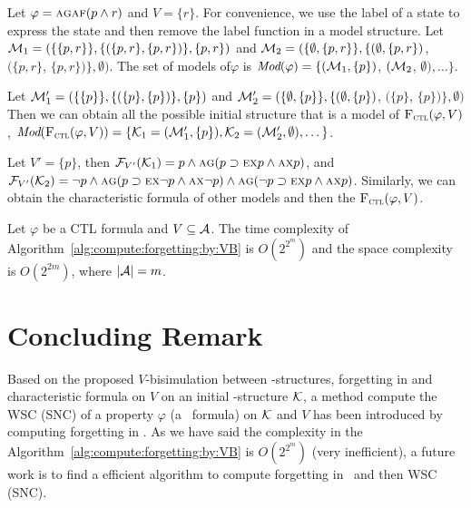 \documentclass{article}
\begin{document}
\begin{example}
Let $\varphi=\textsc{a}\textsc{g} \textsc{a}\textsc{f} (p \wedge r)$ and $V=\{r\}$. For convenience, we use the label of a state to express the state and then remove the label function in a model structure.
Let ${\cal M}_1=(\{\{p,r\}\}, \{(\{p,r\}, \{p,r\})\}, \{p,r\})$ and ${\cal M}_2=(\{\emptyset,\{p,r\}\}, \{(\emptyset, \{p,r\})$, $(\{p,r\}$, $\{p,r\})\}, \emptyset)$.
The set of models of$\varphi$ is $\textit{Mod}(\varphi)=\{({\cal M}_1, \{p\})$, $({\cal M}_2$, $\emptyset), \dots\}$.

Let ${\cal M}_1'=(\{\{p\}\}, \{(\{p\}, \{p\})\}, \{p\})$ and ${\cal M}_2'=(\{\emptyset,\{p\}\}, \{(\emptyset, \{p\})$, $(\{p\}$, $\{p\})\}, \emptyset)$
  Then we can obtain all the possible initial structure that is a model of ${\textsc{F}_{\textsc{ctl}}}(\varphi, V)$, \ie $\textit{Mod}({\textsc{F}_{\textsc{ctl}}}(\varphi, V)) =\{{\cal K}_1=({\cal M}_1', \{p\}), {\cal K}_2=({\cal M}_2', \emptyset), \dots\}$.

Let $V'=\{p\}$, then 
 ${\cal F}_{V'}({\cal K}_1)= p \wedge \textsc{a}\textsc{g} (p\supset \textsc{e} \textsc{x} p \wedge \textsc{a} \textsc{x} p)$,
 and 
 ${\cal F}_{V'}({\cal K}_2)=\neg p\wedge \textsc{a}\textsc{g} (p\supset \textsc{e} \textsc{x} \neg p \wedge \textsc{a} \textsc{x} \neg p) \wedge \textsc{a}\textsc{g} (\neg p\supset \textsc{e} \textsc{x} p \wedge \textsc{a} \textsc{x} p)$. Similarly, we can obtain the characteristic formula of other models and then the ${\textsc{F}_{\textsc{ctl}}}(\varphi, V)$.%
\end{example}

\begin{proposition}
 Let $\varphi$ be a CTL formula and $V\subseteq {\cal A}$. The time complexity of
Algorithm~\ref{alg:compute:forgetting:by:VB} is $O(2^{2^m})$ and the space complexity is $O(2^{2m})$, where $|{\cal A}| = m$.
\end{proposition}

\section{Concluding Remark}
Based on the proposed $V$-bisimulation between \MPK-structures,  forgetting in \CTL and characteristic formula on $V$ on an initial \MPK-structure $\cal K$,
a method compute the WSC (SNC) of a property $\varphi$ (a \CTL\ formula) on $\cal K$ and $V$ has been introduced by computing forgetting in \CTL.
As we have said the complexity in the Algorithm~\ref{alg:compute:forgetting:by:VB} is $O(2^{2^m})$ (very inefficient), a future
work is to find a efficient algorithm to compute forgetting in \CTL\ and then WSC (SNC).
\end{document}
